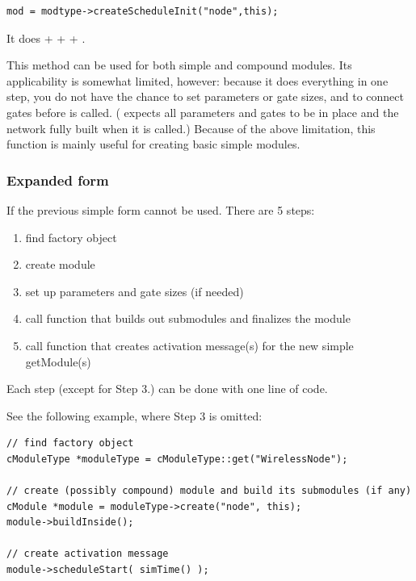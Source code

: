 \begin{verbatim}
mod = modtype->createScheduleInit("node",this);
\end{verbatim}

It does  +  +
 + .

This method can be used for both simple and compound modules.
Its applicability is somewhat limited, however:
because it does everything in one step, you do not have the chance to
set parameters or gate sizes, and to connect gates before
 is called.
( expects all parameters and gates to
be in place and the network fully built when it is called.)
Because of the above limitation, this function is mainly useful
for creating basic simple modules.

%
%

\subsubsection{Expanded form}


If the previous simple form cannot be used. There are 5 steps:
\begin{enumerate}
  \item{find factory object}
  \item{create module}
  \item{set up parameters and gate sizes (if needed)}
  \item{call function that builds out submodules and finalizes the
    module}
  \item{call function that creates activation message(s) for the new
    simple getModule(s)}
\end{enumerate}
Each step (except for Step 3.) can be done with one line of code.



See the following example, where Step 3 is omitted:

\begin{verbatim}
// find factory object
cModuleType *moduleType = cModuleType::get("WirelessNode");

// create (possibly compound) module and build its submodules (if any)
cModule *module = moduleType->create("node", this);
module->buildInside();

// create activation message
module->scheduleStart( simTime() );
\end{verbatim}


